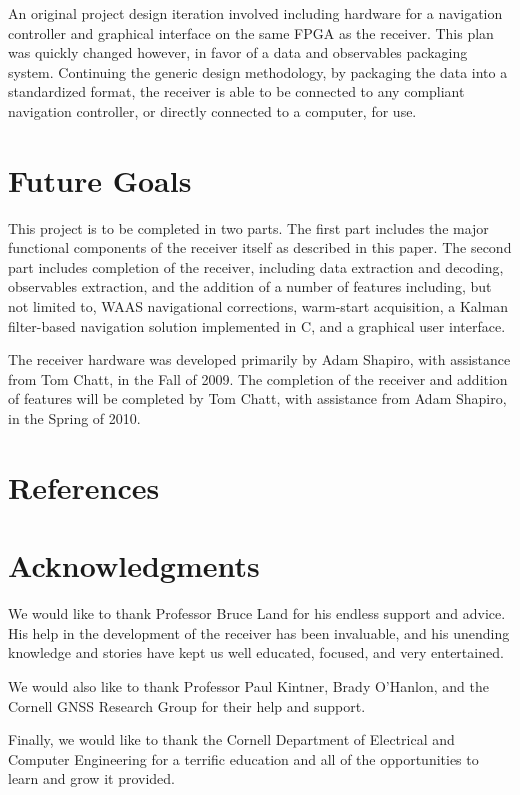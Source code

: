 \documentclass[12pt]{article}
\begin{document}
An original project design iteration involved including hardware for a navigation controller and graphical interface on the same FPGA as the receiver. This plan was quickly changed however, in favor of a data and observables packaging system. Continuing the generic design methodology, by packaging the data into a standardized format, the receiver is able to be connected to any compliant navigation controller, or directly connected to a computer, for use.

\section{Future Goals}
This project is to be completed in two parts. The first part includes the major functional components of the receiver itself as described in this paper. The second part includes completion of the receiver, including data extraction and decoding, observables extraction, and the addition of a number of features including, but not limited to, WAAS navigational corrections, warm-start acquisition, a Kalman filter-based navigation solution implemented in C, and a graphical user interface.

The receiver hardware was developed primarily by Adam Shapiro, with assistance from Tom Chatt, in the Fall of 2009. The completion of the receiver and addition of features will be completed by Tom Chatt, with assistance from Adam Shapiro, in the Spring of 2010.

\section{References}

\section{Acknowledgments}
We would like to thank Professor Bruce Land for his endless support and advice. His help in the development of the receiver has been invaluable, and his unending knowledge and stories have kept us well educated, focused, and very entertained.

We would also like to thank Professor Paul Kintner, Brady O'Hanlon, and the Cornell GNSS Research Group for their help and support.

Finally, we would like to thank the Cornell Department of Electrical and Computer Engineering for a terrific education and all of the opportunities to learn and grow it provided.
\end{document}
